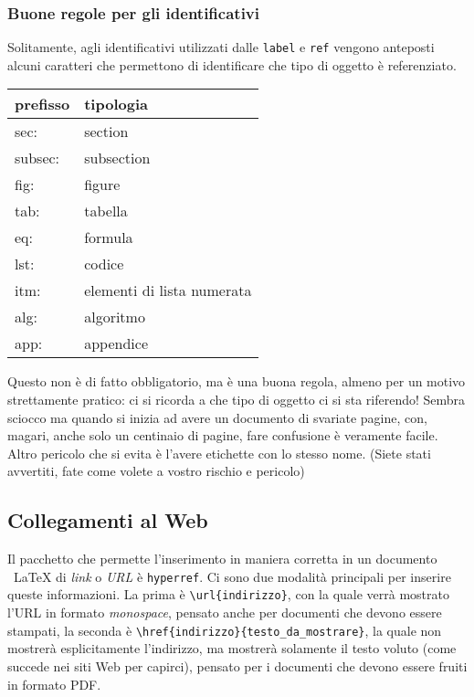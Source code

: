 \subsubsection{Buone regole per gli identificativi}
Solitamente, agli identificativi utilizzati dalle \verb!label! e \verb!ref! 
vengono anteposti alcuni caratteri che permettono di identificare che tipo di 
oggetto è referenziato. 
\begin{table}[]
\centering
\begin{tabular}{ll}
\hline
\textbf{prefisso} & \textbf{tipologia}         \\ \hline
sec:              & section                    \\ \hline
subsec:           & subsection                 \\ \hline
fig:              & figure                     \\ \hline
tab:              & tabella                    \\ \hline
eq:               & formula                    \\ \hline
lst:              & codice                     \\ \hline
itm:              & elementi di lista numerata \\ \hline
alg:              & algoritmo                  \\ \hline
app:              & appendice                  \\ \hline
\end{tabular}
\end{table}
Questo non è di fatto obbligatorio, ma è una buona regola, almeno per un motivo 
strettamente pratico: ci si ricorda a che tipo di oggetto ci si sta riferendo! 
Sembra sciocco ma quando si inizia ad avere un documento di svariate pagine, 
con, magari, anche solo un centinaio di pagine, fare confusione è veramente 
facile. Altro pericolo che si evita è l'avere etichette con lo stesso nome. 
(Siete stati avvertiti, fate come volete a vostro rischio e pericolo)


\subsection{Collegamenti al Web}
Il pacchetto che permette l'inserimento in maniera corretta in un documento \
LaTeX{} di \textit{link} o \textit{URL} è \verb!hyperref!. Ci sono due 
modalità principali per inserire queste informazioni. La prima è 
\verb!\url{indirizzo}!, con la quale verrà mostrato l'URL in formato \textit{
monospace}, pensato anche per documenti che devono essere stampati, la seconda 
è \verb!\href{indirizzo}{testo_da_mostrare}!, la quale non mostrerà 
esplicitamente l'indirizzo, ma mostrerà solamente il testo voluto (come 
succede nei siti Web per capirci), pensato per i documenti che devono 
essere fruiti in formato PDF. 

